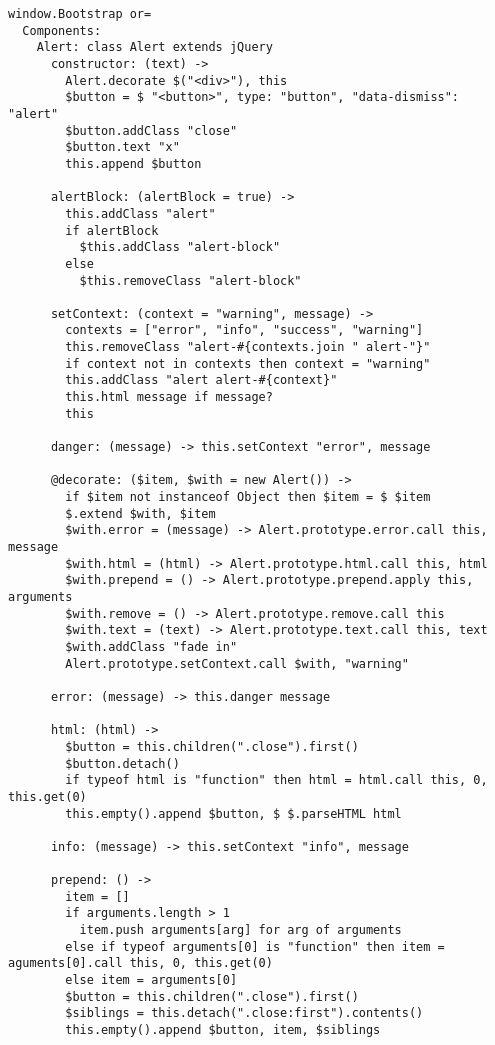 \begin{lstlisting}
window.Bootstrap or=
  Components:
    Alert: class Alert extends jQuery
      constructor: (text) ->
        Alert.decorate $("<div>"), this
        $button = $ "<button>", type: "button", "data-dismiss": "alert"
        $button.addClass "close"
        $button.text "x"
        this.append $button
        
      alertBlock: (alertBlock = true) ->
        this.addClass "alert"
        if alertBlock
          $this.addClass "alert-block"
        else
          $this.removeClass "alert-block"
          
      setContext: (context = "warning", message) ->
        contexts = ["error", "info", "success", "warning"]
        this.removeClass "alert-#{contexts.join " alert-"}"
        if context not in contexts then context = "warning"
        this.addClass "alert alert-#{context}"
        this.html message if message?
        this
          
      danger: (message) -> this.setContext "error", message
        
      @decorate: ($item, $with = new Alert()) ->
        if $item not instanceof Object then $item = $ $item
        $.extend $with, $item
        $with.error = (message) -> Alert.prototype.error.call this, message
        $with.html = (html) -> Alert.prototype.html.call this, html
        $with.prepend = () -> Alert.prototype.prepend.apply this, arguments
        $with.remove = () -> Alert.prototype.remove.call this
        $with.text = (text) -> Alert.prototype.text.call this, text
        $with.addClass "fade in"
        Alert.prototype.setContext.call $with, "warning"
      
      error: (message) -> this.danger message
      
      html: (html) ->
        $button = this.children(".close").first()
        $button.detach()
        if typeof html is "function" then html = html.call this, 0, this.get(0)
        this.empty().append $button, $ $.parseHTML html
      
      info: (message) -> this.setContext "info", message
      
      prepend: () ->
        item = []
        if arguments.length > 1
          item.push arguments[arg] for arg of arguments
        else if typeof arguments[0] is "function" then item = aguments[0].call this, 0, this.get(0)
        else item = arguments[0]
        $button = this.children(".close").first()
        $siblings = this.detach(".close:first").contents()
        this.empty().append $button, item, $siblings
        

\end{lstlisting}
